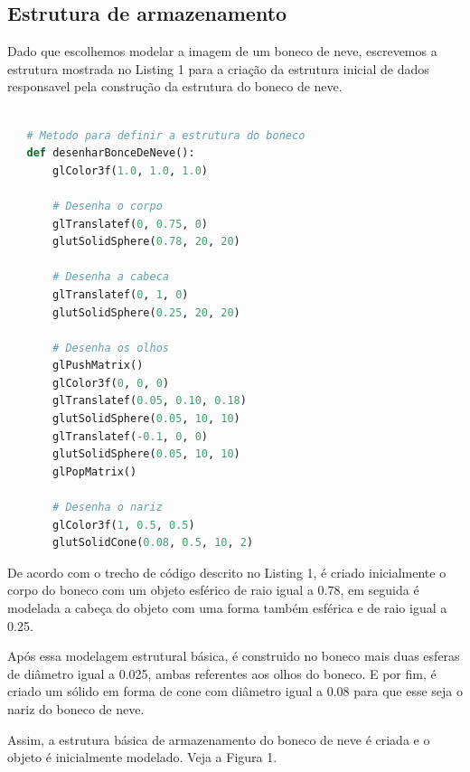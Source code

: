 \documentclass[
	article,			%
	11pt,				%
	oneside,			%
	a4paper,			%
	english,			%
	brazil,				%
	sumario=tradicional
	]{abntex2}
\begin{document}
\subsection{Estrutura de armazenamento}

Dado que escolhemos modelar a imagem de um boneco de neve, escrevemos a estrutura
mostrada no Listing 1 para a criação da estrutura inicial de dados responsavel pela construção da 
estrutura do boneco de neve.  

\begin{lstlisting}[language=Python, caption=Estrutura de armazenamento]
   
   # Metodo para definir a estrutura do boneco
   def desenharBonceDeNeve():
       glColor3f(1.0, 1.0, 1.0)
   
       # Desenha o corpo
       glTranslatef(0, 0.75, 0)
       glutSolidSphere(0.78, 20, 20)
   
       # Desenha a cabeca
       glTranslatef(0, 1, 0)
       glutSolidSphere(0.25, 20, 20)
   
       # Desenha os olhos
       glPushMatrix()
       glColor3f(0, 0, 0)
       glTranslatef(0.05, 0.10, 0.18)
       glutSolidSphere(0.05, 10, 10)
       glTranslatef(-0.1, 0, 0)
       glutSolidSphere(0.05, 10, 10)
       glPopMatrix()
   
       # Desenha o nariz
       glColor3f(1, 0.5, 0.5)
       glutSolidCone(0.08, 0.5, 10, 2)
\end{lstlisting}


De acordo com o trecho de código descrito no Listing 1, é criado inicialmente o corpo do boneco
com um objeto esférico de raio igual a 0.78, em seguida é modelada a cabeça do objeto com uma forma 
também esférica e de raio igual a 0.25.

Após essa modelagem estrutural básica, é construido no boneco mais duas esferas de diâmetro igual a
0.025, ambas referentes aos olhos do boneco. E por fim, é criado um sólido em forma de cone com diâmetro 
igual a 0.08 para que esse seja o nariz do boneco de neve. 

Assim, a estrutura básica de armazenamento do boneco de neve é criada
e o objeto é inicialmente modelado. Veja a Figura 1.
\end{document}
